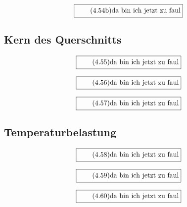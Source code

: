 \documentclass[11pt]{article}
\newcommand{\1}{ {\mathds{1}} }
\begin{document}
\begin{multicols}{2}
		\begin{equation}
			\boxed{
				\tag{4.54b}
				\begin{split}
					\text{da bin ich jetzt zu faul}
				\end{split}
			}
		\end{equation}
		
		\subsection{Kern des Querschnitts}

		\begin{equation}
			\boxed{
				\tag{4.55}
				\begin{split}
					\text{da bin ich jetzt zu faul}
				\end{split}
			}
		\end{equation}
		
		\begin{equation}
			\boxed{
				\tag{4.56}
				\begin{split}
					\text{da bin ich jetzt zu faul}
				\end{split}
			}
		\end{equation}

		\begin{equation}
			\boxed{
				\tag{4.57}
				\begin{split}
					\text{da bin ich jetzt zu faul}
				\end{split}
			}
		\end{equation}
		\subsection{Temperaturbelastung}

		\begin{equation}
			\boxed{
				\tag{4.58}
				\begin{split}
					\text{da bin ich jetzt zu faul}
				\end{split}
			}
		\end{equation}
		
		\begin{equation}
			\boxed{
				\tag{4.59}
				\begin{split}
					\text{da bin ich jetzt zu faul}
				\end{split}
			}
		\end{equation}

		\begin{equation}
			\boxed{
				\tag{4.60}
				\begin{split}
					\text{da bin ich jetzt zu faul}
				\end{split}
			}
		\end{equation}


\end{multicols}
\end{document}
